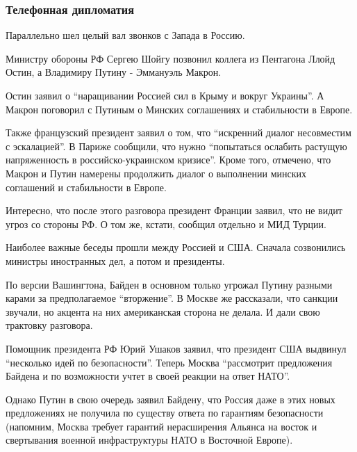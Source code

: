  
 
 
 
 

\subsubsection{Телефонная дипломатия}
\label{sec:13_02_2022.stz.news.ua.strana.1.vozduh_blokada.2.telefonnaja_diplomatia}

Параллельно шел целый вал звонков с Запада в Россию. 

Министру обороны РФ Сергею Шойгу позвонил коллега из Пентагона Ллойд Остин, а
Владимиру Путину - Эммануэль Макрон.

Остин заявил о \enquote{наращивании Россией сил в Крыму и вокруг Украины}. А Макрон
поговорил с Путиным о Минских соглашениях и стабильности в Европе.

Также французский президент заявил о том, что \enquote{искренний диалог несовместим с
эскалацией}. В Париже сообщили, что нужно \enquote{попытаться ослабить растущую
напряженность в российско-украинском кризисе}. Кроме того, отмечено, что Макрон
и Путин намерены продолжить диалог о выполнении минских соглашений и
стабильности в Европе.

Интересно, что после этого разговора президент Франции заявил, что не видит
угроз со стороны РФ. О том же, кстати, сообщил отдельно и МИД Турции.

Наиболее важные беседы прошли между Россией и США. Сначала созвонились министры
иностранных дел, а потом и президенты. 

По версии Вашингтона, Байден в основном только угрожал Путину разными карами за
предполагаемое \enquote{вторжение}. В Москве же рассказали, что санкции звучали, но
акцента на них американская сторона не делала. И дали свою трактовку разговора.

Помощник президента РФ Юрий Ушаков заявил, что президент США выдвинул
\enquote{несколько идей по безопасности}. Теперь Москва \enquote{рассмотрит предложения Байдена
и по возможности учтет в своей реакции на ответ НАТО}.

Однако Путин в свою очередь заявил Байдену, что Россия даже в этих новых
предложениях не получила по существу ответа по гарантиям безопасности
(напомним, Москва требует гарантий нерасширения Альянса на восток и свертывания
военной инфраструктуры НАТО в Восточной Европе).

